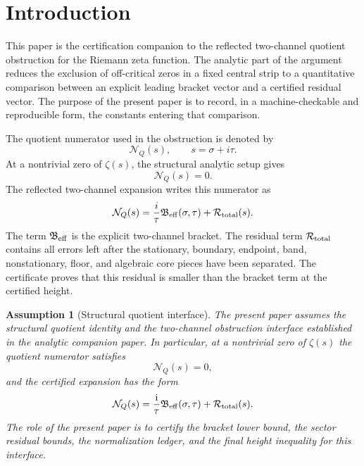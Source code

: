 \documentclass[11pt]{article}
\newtheorem{assumption}[theorem]{Assumption}
\newcommand{\ii}{\mathrm{i}}
\newcommand{\sig}{\sigma}
\newcommand{\tauh}{\tau}
\newcommand{\NQ}{\mathcal N_Q}
\newcommand{\Beff}{\mathfrak B_{\rm eff}}
\newcommand{\Rtot}{\mathcal R_{\rm total}}
\begin{document}
\section{Introduction}

This paper is the certification companion to the reflected two-channel quotient
obstruction for the Riemann zeta function.  The analytic part of the argument
reduces the exclusion of off-critical zeros in a fixed central strip to a
quantitative comparison between an explicit leading bracket vector and a
certified residual vector.  The purpose of the present paper is to record, in a
machine-checkable and reproducible form, the constants entering that comparison.

The quotient numerator used in the obstruction is denoted by
\[
        \mathcal N_Q(s),
        \qquad s=\sigma+i\tau.
\]
At a nontrivial zero of \(\zeta(s)\), the structural analytic setup gives
\[
        \mathcal N_Q(s)=0.
\]
The reflected two-channel expansion writes this numerator as
\[
        \mathcal N_Q(s)
        =
        \frac{i}{\tau}\mathfrak B_{\rm eff}(\sigma,\tau)
        +
        \mathcal R_{\rm total}(s).
\]
The term \(\mathfrak B_{\rm eff}\) is the explicit two-channel bracket.  The
residual term \(\mathcal R_{\rm total}\) contains all errors left after the
stationary, boundary, endpoint, band, nonstationary, floor, and algebraic core
pieces have been separated.  The certificate proves that this residual is
smaller than the bracket term at the certified height.

\begin{assumption}[Structural quotient interface]
The present paper assumes the structural quotient identity and the
two-channel obstruction interface established in the analytic companion paper.
In particular, at a nontrivial zero of \(\zeta(s)\) the quotient numerator
satisfies
\[
        \NQ(s)=0,
\]
and the certified expansion has the form
\[
        \NQ(s)
        =
        \frac{\ii}{\tauh}\Beff(\sig,\tauh)
        +
        \Rtot(s).
\]
The role of the present paper is to certify the bracket lower bound, the
sector residual bounds, the normalization ledger, and the final height
inequality for this interface.
\end{assumption}
\end{document}
